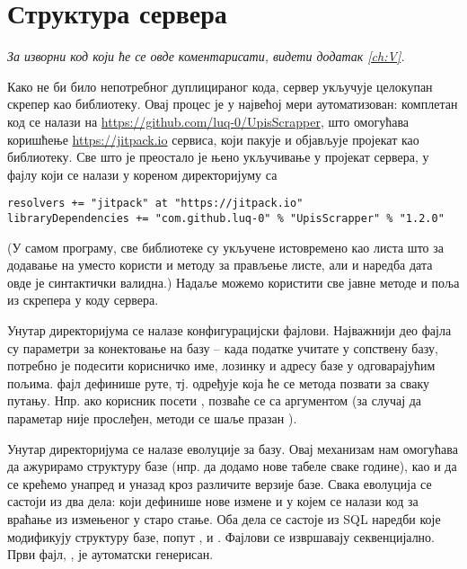 \section{Структура сервера}
\vspace*{-7mm}
\emph{За изворни код који ће се овде коментарисати, видети додатак \ref{ch:V}.}

Како не би било непотребног дуплицираног кода, сервер укључује целокупан скрепер као библиотеку. Овај процес је у највећој мери аутоматизован: комплетан код се налази на \url{https://github.com/luq-0/UpisScrapper}, што омогућава коришћење \url{https://jitpack.io} сервиса, који пакује и објављује пројекат као библиотеку. Све што је преостало је њено укључивање у пројекат сервера, у фајлу  који се налази у кореном директоријуму са 
\begin{verbatim}
resolvers += "jitpack" at "https://jitpack.io"
libraryDependencies += "com.github.luq-0" % "UpisScrapper" % "1.2.0"
\end{verbatim}
(У самом програму, све библиотеке су укључене истовремено као листа што за додавање на  уместо \code{++=} користи \code{+=} и  методу за прављење листе, али и наредба дата овде је синтактички валидна.) Надаље можемо користити све јавне методе и поља из скрепера у коду сервера.

Унутар  директоријума се налазе конфигурацијски фајлови. Најважнији део  фајла су параметри за конектовање на базу -- када податке учитате у сопствену базу, потребно је подесити корисничко име, лозинку и адресу базе у одговарајућим  пољима.  фајл дефинише руте, тј. одређује која ће се метода позвати за сваку путању. Нпр. ако корисник посети , позваће се  са аргументом  (за случај да  параметар није прослеђен, методи се шаље празан ).

Унутар  директоријума се налазе еволуције за  базу. Овај механизам нам омогућава да ажурирамо структуру базе (нпр. да додамо нове табеле сваке године), као и да се крећемо унапред и уназад кроз различите верзије базе. Свака еволуција се састоји из два дела:  који дефинише нове измене и  у којем се налази код за враћање из измењеног у старо стање. Оба дела се састоје из SQL наредби које модификују структуру базе, попут ,  и . Фајлови се извршавају секвенцијално. Први фајл, , је аутоматски генерисан.

